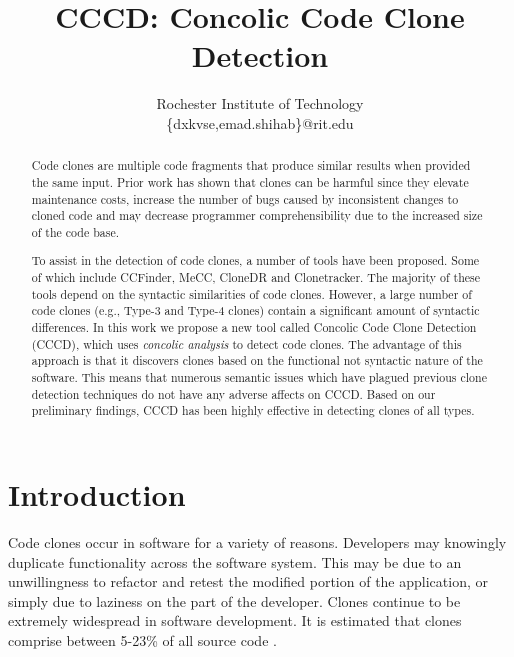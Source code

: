 \documentclass[conference]{IEEEtran}
\begin{document}
%
\title{CCCD: Concolic Code Clone Detection}


\author{
Rochester Institute of Technology\\
\{dxkvse,emad.shihab\}@rit.edu

}


\maketitle


\begin{abstract}
Code clones are multiple code fragments that produce similar results when provided the same input. Prior work has shown that clones can be harmful since they elevate maintenance costs, increase the number of bugs caused by inconsistent changes to cloned code and may decrease programmer comprehensibility due to the increased size of the code base.  

To assist in the detection of code clones, a number of tools have been proposed. Some of which include CCFinder, MeCC, CloneDR and Clonetracker. The majority of these tools depend on the syntactic similarities of code clones. However, a large number of code clones (e.g., Type-3 and Type-4 clones) contain a significant amount of syntactic differences. In this work we propose a new tool called Concolic Code Clone Detection (CCCD), which uses \emph{concolic analysis} to detect code clones. The advantage of this approach is that it discovers clones based on the functional not syntactic nature of the software. This means that numerous semantic issues which have plagued previous clone detection techniques do not have any adverse affects on CCCD. Based on our preliminary findings, CCCD has been highly effective in detecting clones of all types.
\end{abstract}


\IEEEpeerreviewmaketitle



\section{Introduction}

Code clones occur in software for a variety of reasons. Developers may knowingly duplicate functionality across the software system. This may be due to an unwillingness to refactor and retest the modified portion of the application, or simply due to laziness on the part of the developer. Clones continue to be extremely widespread in software development. It is estimated that clones comprise between 5-23\% of all source code \cite{Baxter:1998:CDU:850947.853341} \cite{Schulze:2010:CCF:1942788.1868310}.
\end{document}
